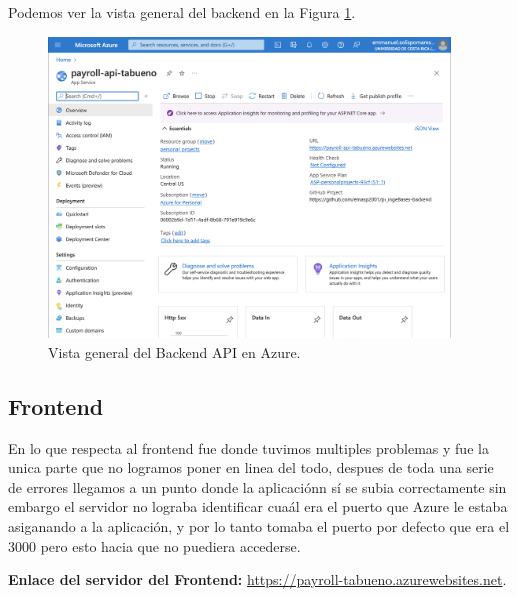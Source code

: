 \documentclass{article}
\begin{document}
Podemos ver la vista general del backend en la Figura \ref{fig:backend}.
\begin{figure}[h]
  \centering
  \includegraphics[width=0.95\textwidth]{backend.png}
  \caption{Vista general del Backend API en Azure.}
  \label{fig:backend}
 \end{figure}

 \subsection{Frontend}
En lo que respecta al frontend fue donde tuvimos multiples problemas y fue la unica parte
que no logramos poner en linea del todo, despues de toda una serie de errores llegamos a un
punto donde la aplicaciónn sí se subia correctamente sin embargo el servidor no lograba
identificar cuaál era el puerto que Azure le estaba asiganando a la aplicación, y por lo tanto
tomaba el puerto por defecto que era el 3000 pero esto hacia que no puediera accederse.

\textbf{Enlace del servidor del Frontend:} \href{https://payroll-tabueno.azurewebsites.net}{https://payroll-tabueno.azurewebsites.net}.
\end{document}

